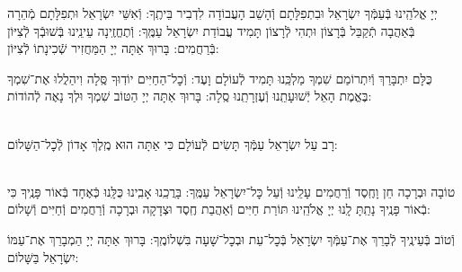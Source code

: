 \documentclass[twoside, openany, parskip=half, 11pt]{book}
\begin{document}
יְיָ אֱלֹהֵֽינוּ בְּֿעַמְּֿךָ יִשְׂרָאֵל וּבִתְפִלָּתָם וְֿהָשֵׁב הָעֲבוֹדָה לִדְבִיר בֵּיתֶֽךָ: וְֿאִשֵּׁי יִשְׂרָאֵל וּתְפִלָּתָם מְֿהֵרָה בְּֿאַהֲבָה תְֿקַבֵּל בְּֿרָצוֹן וּתְהִי לְֿרָצוֹן תָּמִיד עֲבוֹדַת יִשְׂרָאֵל עַמֶּֽךָ: וְֿתֶחֱזֶֽינָה עֵינֵֽינוּ בְּֿשׁוּבְֿךָ לְֿצִיּוֹן בְּֿרַחֲמִים: בָּרוּךְ אַתָּה יְיָ הַמַּחֲזִיר שְֿׁכִינָתוֹ לְֿצִיּוֹן:

\modim

כֻּלָּם יִתְבָּרַךְ וְֿיִתְרוֹמַם שִׁמְךָ מַלְכֵּֽנוּ תָּמִיד לְֿעוֹלָם וָעֶד: וְֿכׇל־הַחַיִּים יוֹדֽוּךָ סֶּֽלָה וִיהַלֲלוּ אֶת־שִׁמְךָ בֶּאֱמֶת הָאֵל יְֿשׁוּעָתֵֽנוּ וְֿעֶזְרָתֵֽנוּ סֶֽלָה: בָּרוּךְ אַתָּה יְיָ הַטּוֹב שִׁמְךָ וּלְךָ נָאֶה לְֿהוֹדוֹת:







\begin{paracol}{2}

\\
רָב עַל יִשְׂרָאֵל עַמְּֿךָ תָּשִׂים לְֿעוֹלָם כִּי אַתָּה הוּא מֶֽלֶךְ אָדוֹן לְֿכׇל־הַשָּׁלוֹם:

\switchcolumn


\begin{small}
\\
טוֹבָה וּבְרָכָה חֵן וָחֶֽסֶד וְֿרַחֲמִים עָלֵֽינוּ וְֿעַל כׇּל־יִשְׂרָאֵל עַמֶּֽךָ: בָּרֲכֵֽנוּ אָבִֽינוּ כֻּלָּֽנוּ כְּֿאֶחָד בְּֿאוֹר פָּנֶֽיךָ כִּי בְֿאוֹר פָּנֶֽיךָ נָתַֽתָּ לָֽנוּ יְיָ אֱלֹהֵֽינוּ תּוֹרַת חַיִּים וְֿאַהֲבַת חֶֽסֶד וּצְדָקָה וּבְרָכָה וְֿרַחֲמִים וְֿחַיִּים וְֿשָׁלוֹם:

\end{small}


\end{paracol}
וְֿטוֹב בְּֿעֵינֶֽיךָ לְֿבָרֵךְ אֶת־עַמְּֿךָ יִשְׂרָאֵל בְּֿכׇל־עֵת וּבְכׇל־שָׁעָה בִּשְׁלוֹמֶֽךָ: בָּרוּךְ אַתָּה יְיָ הַמְבָרֵךְ אֶת־עַמּוֹ יִשְׂרָאֵל בַּשָּׁלוֹם:

\tachanunim


\vfill

\end{document}
